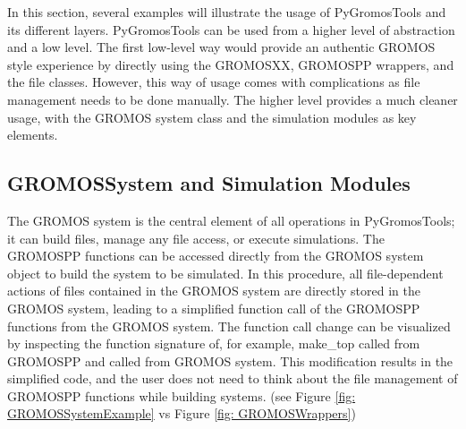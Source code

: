 In this section, several examples will illustrate the usage of PyGromosTools and its different layers. PyGromosTools can be used from a higher level of abstraction and a low level. The first low-level way would provide an authentic GROMOS style experience by directly using the GROMOSXX, GROMOSPP wrappers, and the file classes. However, this way of usage comes with complications as file management needs to be done manually. The higher level provides a much cleaner usage, with the GROMOS system class and the simulation modules as key elements. 

\subsection{GROMOSSystem and Simulation Modules}
The GROMOS system is the central element of all operations in PyGromosTools; it can build files, manage any file access, or execute simulations. The GROMOSPP functions can be accessed directly from the GROMOS system object to build the system to be simulated.  In this procedure, all file-dependent actions of files contained in the GROMOS system are directly stored in the GROMOS system, leading to a simplified function call of the GROMOSPP functions from the GROMOS system. The function call change can be visualized by inspecting the function signature of, for example, make\_top called from GROMOSPP and called from GROMOS system. This modification results in the simplified code, and the user does not need to think about the file management of GROMOSPP functions while building systems. (see Figure \ref{fig: GROMOSSystemExample} vs Figure \ref{fig: GROMOSWrappers})

